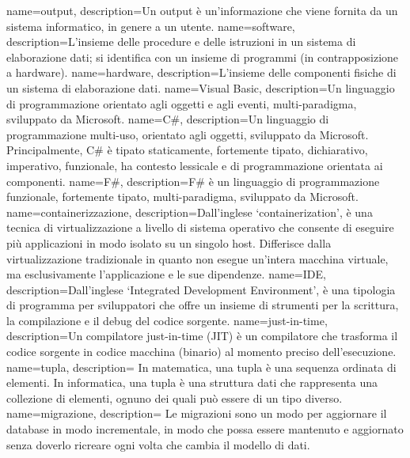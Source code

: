 {
    name=output,
    description={Un output è un'informazione che viene fornita da un sistema informatico, in genere a un utente.}
}
{
    name=software,
    description={L'insieme delle procedure e delle istruzioni in un sistema di elaborazione dati; si identifica con un insieme di programmi (in contrapposizione a hardware).}
}
{
    name=hardware,
    description={L'insieme delle componenti fisiche di un sistema di elaborazione dati.}
}
{
    name=Visual Basic,
    description={Un linguaggio di programmazione orientato agli oggetti e agli eventi, multi-paradigma, sviluppato da Microsoft.}
}
{
    name=C\#,
    description={Un linguaggio di programmazione multi-uso, orientato agli oggetti, sviluppato da Microsoft. Principalmente, C\# è tipato staticamente, fortemente tipato, dichiarativo, imperativo, funzionale, ha contesto lessicale e di programmazione orientata ai componenti.}
}
{
    name=F\#,
    description={F\# è un linguaggio di programmazione funzionale, fortemente tipato, multi-paradigma, sviluppato da Microsoft.}
}
{
    name=containerizzazione,
    description={Dall'inglese `containerization', è una tecnica di virtualizzazione a livello di sistema operativo che consente di eseguire più applicazioni in modo isolato su un singolo host. Differisce dalla virtualizzazione tradizionale in quanto non esegue un'intera macchina virtuale, ma esclusivamente l'applicazione e le sue dipendenze.}
}
{
    name=IDE,
    description={Dall'inglese `Integrated Development Environment', è una tipologia di programma per sviluppatori che offre un insieme di strumenti per la scrittura, la compilazione e il debug del codice sorgente.}
}
{
    name=just-in-time,
    description={Un compilatore just-in-time (JIT) è un compilatore che trasforma il codice sorgente in codice macchina (binario) al momento preciso dell'esecuzione.}
}
{
    name=tupla,
    description={
        In matematica, una tupla è una sequenza ordinata di elementi. In informatica, una tupla è una struttura dati che rappresenta una collezione di elementi, ognuno dei quali può essere di un tipo diverso.}
}
{
    name=migrazione,
    description={
        Le migrazioni sono un modo per aggiornare il database in modo incrementale, in modo che possa essere mantenuto e aggiornato senza doverlo ricreare ogni volta che cambia il modello di dati.
        }
}
